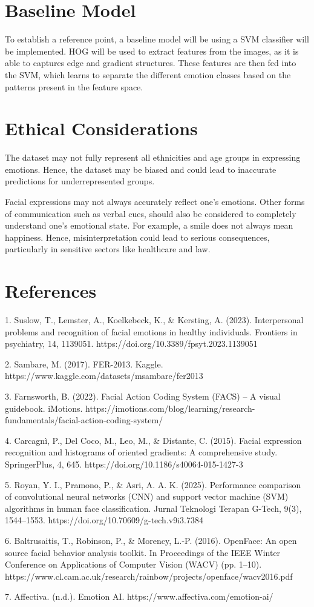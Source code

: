 \documentclass[final]{article}
\begin{document}
\section*{Baseline Model}
To establish a reference point, a baseline model will be using a SVM classifier will be implemented. HOG will be used to extract features from the images, as it is able to captures edge and gradient structures. These features are then fed into the SVM, which learns to separate the different emotion classes based on the patterns present in the feature space.

\section*{Ethical Considerations}
The dataset may not fully represent all ethnicities and age groups in expressing emotions. Hence, the dataset may be biased and could lead to inaccurate predictions for underrepresented groups.

Facial expressions may not always accurately reflect one's emotions. Other forms of communication such as verbal cues,  should also be considered to completely understand one's emotional state. For example, a smile does not always mean happiness. Hence, misinterpretation could lead to serious consequences, particularly in sensitive sectors like healthcare and law.


\newpage
\section*{References}
1. Suslow, T., Lemster, A., Koelkebeck, K., \& Kersting, A. (2023). Interpersonal problems and recognition of facial emotions in healthy individuals. Frontiers in psychiatry, 14, 1139051. https://doi.org/10.3389/fpsyt.2023.1139051

2. Sambare, M. (2017). FER-2013. Kaggle. https://www.kaggle.com/datasets/msambare/fer2013

3. Farnsworth, B. (2022). Facial Action Coding System (FACS) – A visual guidebook. iMotions. https://imotions.com/blog/learning/research-fundamentals/facial-action-coding-system/

4. Carcagnì, P., Del Coco, M., Leo, M., \& Distante, C. (2015). Facial expression recognition and histograms of oriented gradients: A comprehensive study. SpringerPlus, 4, 645. https://doi.org/10.1186/s40064-015-1427-3

5. Royan, Y. I., Pramono, P., \& Asri, A. A. K. (2025). Performance comparison of convolutional neural networks (CNN) and support vector machine (SVM) algorithms in human face classification. Jurnal Teknologi Terapan G-Tech, 9(3), 1544–1553. https://doi.org/10.70609/g-tech.v9i3.7384

6. Baltrusaitis, T., Robinson, P., \& Morency, L.-P. (2016). OpenFace: An open source facial behavior analysis toolkit. In Proceedings of the IEEE Winter Conference on Applications of Computer Vision (WACV) (pp. 1–10). https://www.cl.cam.ac.uk/research/rainbow/projects/openface/wacv2016.pdf

7. Affectiva. (n.d.). Emotion AI. https://www.affectiva.com/emotion-ai/
\end{document}
